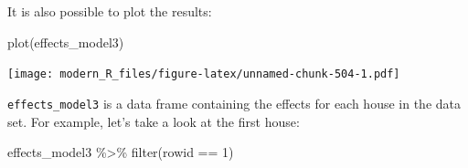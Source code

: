 \documentclass[
]{article}
\newenvironment{Shaded}{\begin{snugshade}}{\end{snugshade}}
\newcommand{\DecValTok}[1]{\textcolor[rgb]{0.00,0.00,0.81}{#1}}
\newcommand{\FunctionTok}[1]{\textcolor[rgb]{0.00,0.00,0.00}{#1}}
\newcommand{\NormalTok}[1]{#1}
\newcommand{\SpecialCharTok}[1]{\textcolor[rgb]{0.00,0.00,0.00}{#1}}
\begin{document}
It is also possible to plot the results:

\begin{Shaded}
\begin{Highlighting}[]
\FunctionTok{plot}\NormalTok{(effects\_model3)}
\end{Highlighting}
\end{Shaded}

\texttt{[image: modern\_R\_files/figure-latex/unnamed-chunk-504-1.pdf]}

\texttt{effects\_model3} is a data frame containing the effects for each house in the data set. For example,
let's take a look at the first house:

\begin{Shaded}
\begin{Highlighting}[]
\NormalTok{effects\_model3 }\SpecialCharTok{\%\textgreater{}\%}
  \FunctionTok{filter}\NormalTok{(rowid }\SpecialCharTok{==} \DecValTok{1}\NormalTok{)}
\end{Highlighting}
\end{Shaded}
\end{document}
